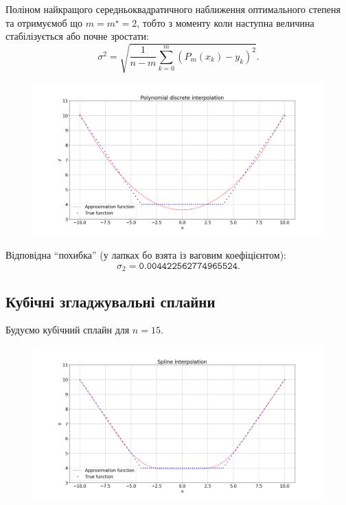 Поліном найкращого середньоквадратичного наближення оптимального степеня та отримуємоб що $m = m^\star = 2$, тобто з моменту коли наступна величина стабілізується або почне зростати: \[\sigma^2 = \sqrt{\frac{1}{n - m} \sum_{k = 0}^m( P_m(x_k) - y_k)^2}.\] 
\vspace{-1.5em}
\begin{figure}[H]
    \centering
    \includegraphics[width=\textwidth]{5.png}
\end{figure}
\vspace{-.5em}
Відповідна ``похибка'' (у лапках бо взята із ваговим коефіцієнтом): \[ \sigma_2 = \texttt{0.004422562774965524}. \]

\newpage

\subsection{Кубічні згладжувальні сплайни}

Будуємо кубічний сплайн для $n = 15$.

\begin{figure}[H]
    \centering
    \includegraphics[width=\textwidth]{6.png}
\end{figure}


